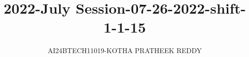 \documentclass[journal]{IEEEtran}
\begin{document}

\vspace{3cm}

\title{2022-July Session-07-26-2022-shift-1-1-15}
\author{AI24BTECH11019-KOTHA PRATHEEK REDDY}

 \maketitle
{\let\newpage\relax\maketitle}

\renewcommand{\thefigure}{\theenumi}
\renewcommand{\thetable}{\theenumi}
\setlength{\intextsep}{10pt} %


\renewcommand{\thetable}{\theenumi}
\end{document}
